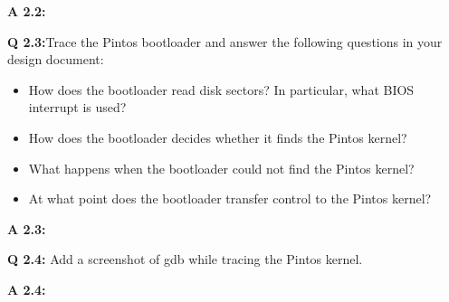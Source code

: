 \documentclass[a4paper,11pt]{paper}
\begin{document}
\textbf{A 2.2:}


\textbf{Q 2.3:}Trace the Pintos bootloader and answer the following questions in your design document:
\begin{itemize}
    \item How does the bootloader read disk sectors? In particular, what BIOS interrupt is used?
    \item How does the bootloader decides whether it finds the Pintos kernel?
    \item What happens when the bootloader could not find the Pintos kernel?
    \item At what point does the bootloader transfer control to the Pintos kernel?
\end{itemize}

\textbf{A 2.3:}


\textbf{Q 2.4:} Add a screenshot of gdb while tracing the Pintos kernel.

\textbf{A 2.4:}
\end{document}
